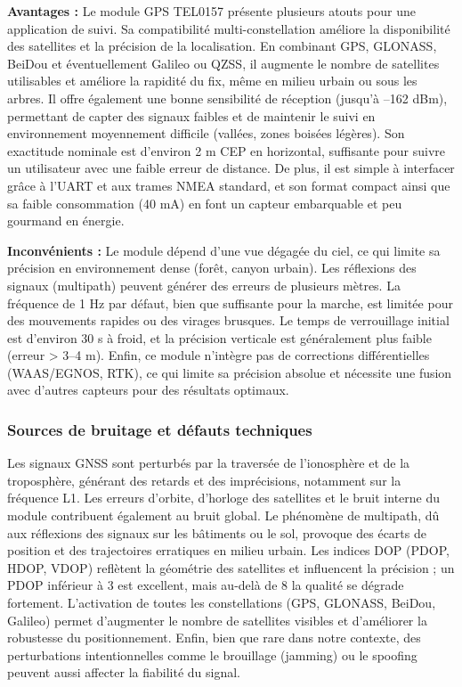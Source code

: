 \textbf{Avantages :}  
Le module GPS TEL0157 présente plusieurs atouts pour une application de suivi. Sa compatibilité multi-constellation améliore la disponibilité des satellites et la précision de la localisation. En combinant GPS, GLONASS, BeiDou et éventuellement Galileo ou QZSS, il augmente le nombre de satellites utilisables et améliore la rapidité du fix, même en milieu urbain ou sous les arbres.  
Il offre également une bonne sensibilité de réception (jusqu’à –162 dBm), permettant de capter des signaux faibles et de maintenir le suivi en environnement moyennement difficile (vallées, zones boisées légères).  
Son exactitude nominale est d’environ 2 m CEP en horizontal, suffisante pour suivre un utilisateur avec une faible erreur de distance.  
De plus, il est simple à interfacer grâce à l’UART et aux trames NMEA standard, et son format compact ainsi que sa faible consommation (40 mA) en font un capteur embarquable et peu gourmand en énergie.

\textbf{Inconvénients :}  
Le module dépend d’une vue dégagée du ciel, ce qui limite sa précision en environnement dense (forêt, canyon urbain). Les réflexions des signaux (multipath) peuvent générer des erreurs de plusieurs mètres.  
La fréquence de 1 Hz par défaut, bien que suffisante pour la marche, est limitée pour des mouvements rapides ou des virages brusques.  
Le temps de verrouillage initial est d’environ 30 s à froid, et la précision verticale est généralement plus faible (erreur > 3–4 m).  
Enfin, ce module n’intègre pas de corrections différentielles (WAAS/EGNOS, RTK), ce qui limite sa précision absolue et nécessite une fusion avec d’autres capteurs pour des résultats optimaux.

\vspace{2em}

\subsubsection{Sources de bruitage et défauts techniques}

Les signaux GNSS sont perturbés par la traversée de l’ionosphère et de la troposphère, générant des retards et des imprécisions, notamment sur la fréquence L1. Les erreurs d’orbite, d’horloge des satellites et le bruit interne du module contribuent également au bruit global.  
Le phénomène de multipath, dû aux réflexions des signaux sur les bâtiments ou le sol, provoque des écarts de position et des trajectoires erratiques en milieu urbain.  
Les indices DOP (PDOP, HDOP, VDOP) reflètent la géométrie des satellites et influencent la précision ; un PDOP inférieur à 3 est excellent, mais au-delà de 8 la qualité se dégrade fortement. L’activation de toutes les constellations (GPS, GLONASS, BeiDou, Galileo) permet d’augmenter le nombre de satellites visibles et d’améliorer la robustesse du positionnement.  
Enfin, bien que rare dans notre contexte, des perturbations intentionnelles comme le brouillage (jamming) ou le spoofing peuvent aussi affecter la fiabilité du signal.

